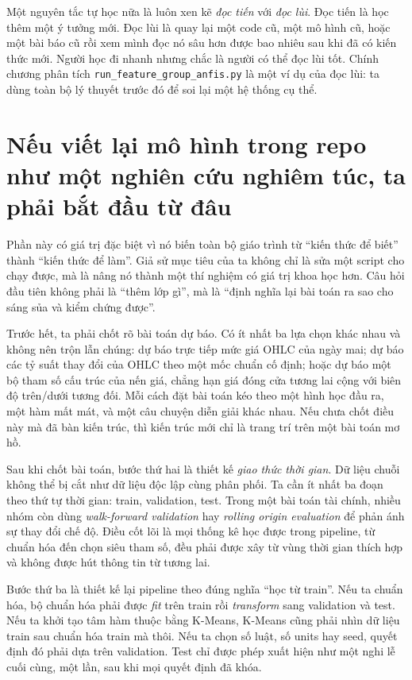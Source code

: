 Một nguyên tắc tự học nữa là luôn xen kẽ \emph{đọc tiến} với \emph{đọc lùi}. Đọc tiến là học thêm một ý tưởng mới. Đọc lùi là quay lại một code cũ, một mô hình cũ, hoặc một bài báo cũ rồi xem mình đọc nó sâu hơn được bao nhiêu sau khi đã có kiến thức mới. Người học đi nhanh nhưng chắc là người có thể đọc lùi tốt. Chính chương phân tích \texttt{run\_feature\_group\_anfis.py} là một ví dụ của đọc lùi: ta dùng toàn bộ lý thuyết trước đó để soi lại một hệ thống cụ thể.

\section{Nếu viết lại mô hình trong repo như một nghiên cứu nghiêm túc, ta phải bắt đầu từ đâu}

Phần này có giá trị đặc biệt vì nó biến toàn bộ giáo trình từ ``kiến thức để biết'' thành ``kiến thức để làm''. Giả sử mục tiêu của ta không chỉ là sửa một script cho chạy được, mà là nâng nó thành một thí nghiệm có giá trị khoa học hơn. Câu hỏi đầu tiên không phải là ``thêm lớp gì'', mà là ``định nghĩa lại bài toán ra sao cho sáng sủa và kiểm chứng được''.

Trước hết, ta phải chốt rõ bài toán dự báo. Có ít nhất ba lựa chọn khác nhau và không nên trộn lẫn chúng: dự báo trực tiếp mức giá OHLC của ngày mai; dự báo các tỷ suất thay đổi của OHLC theo một mốc chuẩn cố định; hoặc dự báo một bộ tham số cấu trúc của nến giá, chẳng hạn giá đóng cửa tương lai cộng với biên độ trên/dưới tương đối. Mỗi cách đặt bài toán kéo theo một hình học đầu ra, một hàm mất mát, và một câu chuyện diễn giải khác nhau. Nếu chưa chốt điều này mà đã bàn kiến trúc, thì kiến trúc mới chỉ là trang trí trên một bài toán mơ hồ.

Sau khi chốt bài toán, bước thứ hai là thiết kế \emph{giao thức thời gian}. Dữ liệu chuỗi không thể bị cắt như dữ liệu độc lập cùng phân phối. Ta cần ít nhất ba đoạn theo thứ tự thời gian: train, validation, test. Trong một bài toán tài chính, nhiều nhóm còn dùng \emph{walk-forward validation} hay \emph{rolling origin evaluation} để phản ánh sự thay đổi chế độ. Điều cốt lõi là mọi thống kê học được trong pipeline, từ chuẩn hóa đến chọn siêu tham số, đều phải được xây từ vùng thời gian thích hợp và không được hút thông tin từ tương lai.

Bước thứ ba là thiết kế lại pipeline theo đúng nghĩa ``học từ train''. Nếu ta chuẩn hóa, bộ chuẩn hóa phải được \emph{fit} trên train rồi \emph{transform} sang validation và test. Nếu ta khởi tạo tâm hàm thuộc bằng K-Means, K-Means cũng phải nhìn dữ liệu train sau chuẩn hóa train mà thôi. Nếu ta chọn số luật, số units hay seed, quyết định đó phải dựa trên validation. Test chỉ được phép xuất hiện như một nghi lễ cuối cùng, một lần, sau khi mọi quyết định đã khóa.

